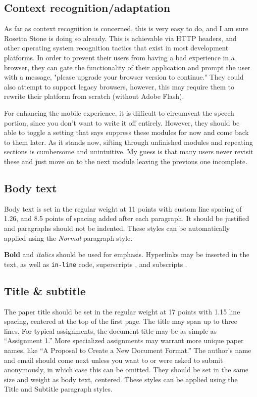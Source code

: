 \subsection{Context recognition/adaptation}

As far as context recognition is concerned, this is very easy to do, and I am sure Rosetta Stone is doing so already. This is achievable via HTTP headers, and other operating system recognition tactics that exist in most development platforms. In order to prevent their users from having a bad experience in a browser, they can gate the functionality of their application and prompt the user with a message, "please upgrade your browser version to continue." They could also attempt to support legacy browsers, however, this may require them to rewrite their platform from scratch (without Adobe Flash).

For enhancing the mobile experience, it is difficult to circumvent the speech portion, since you don't want to write it off entirely. However, they should be able to toggle a setting that says suppress these modules for now and come back to them later. As it stands now, sifting through unfinished modules and repeating sections is cumbersome and unintuitive. My guess is that many users never revisit these and just move on to the next module leaving the previous one incomplete.




\subsection{Body text}
Body text is set in the regular weight at 11 points with custom line spacing of 1.26, and 8.5 points of spacing added after each paragraph. It should be justified and paragraphs should not be indented. These styles can be automatically applied using the \emph{Normal} paragraph style.

\textbf{Bold} and \emph{italics} should be used for emphasis. Hyperlinks may be inserted in the text, as well as \texttt{in-line} code, superscripts , and subscripts .

\subsection{Title \& subtitle}
The paper title should be set in the regular weight at 17 points with 1.15 line spacing, centered at the top of the first page. The title may span up to three lines. For typical assignments, the document title may be as simple as “Assignment 1.” More specialized assignments may warrant more unique paper names, like “A Proposal to Create a New Document Format.”
The author’s name and email should come next unless you want to or were asked to submit anonymously, in which case this can be omitted. They should be set in the same size and weight as body text, centered. These styles can be applied using the Title and Subtitle paragraph styles.

